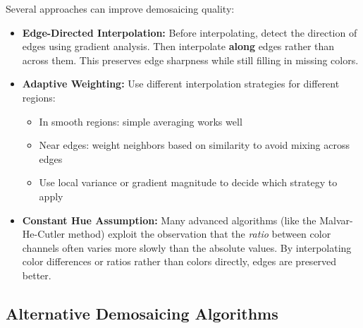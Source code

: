 \documentclass[12pt]{article}
\begin{document}
Several approaches can improve demosaicing quality:

\begin{itemize}
    \item \textbf{Edge-Directed Interpolation:} Before interpolating, detect the direction of edges using gradient analysis. Then interpolate \textbf{along} edges rather than across them. This preserves edge sharpness while still filling in missing colors.
    
    \item \textbf{Adaptive Weighting:} Use different interpolation strategies for different regions:
    \begin{itemize}
        \item In smooth regions: simple averaging works well
        \item Near edges: weight neighbors based on similarity to avoid mixing across edges
        \item Use local variance or gradient magnitude to decide which strategy to apply
    \end{itemize}
    
    \item \textbf{Constant Hue Assumption:} Many advanced algorithms (like the Malvar-He-Cutler method) exploit the observation that the \textit{ratio} between color channels often varies more slowly than the absolute values. By interpolating color differences or ratios rather than colors directly, edges are preserved better.
\end{itemize}

\subsection*{Alternative Demosaicing Algorithms}
\end{document}
